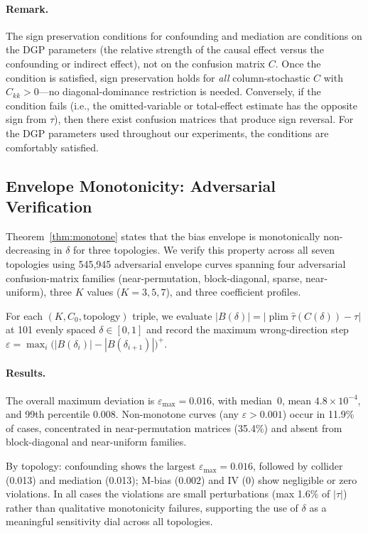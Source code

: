 \paragraph{Remark.}
The sign preservation conditions for confounding and mediation are conditions on the DGP parameters (the relative strength of the causal effect versus the confounding or indirect effect), not on the confusion matrix $C$.
Once the condition is satisfied, sign preservation holds for \emph{all} column-stochastic $C$ with $C_{kk}>0$---no diagonal-dominance restriction is needed.
Conversely, if the condition fails (i.e., the omitted-variable or total-effect estimate has the opposite sign from $\tau$), then there exist confusion matrices that produce sign reversal.
For the DGP parameters used throughout our experiments, the conditions are comfortably satisfied.

\subsection{Envelope Monotonicity: Adversarial Verification}
\label{app:monotonicity}

Theorem~\ref{thm:monotone} states that the bias envelope is monotonically non-decreasing in $\delta$ for three topologies.
We verify this property across all seven topologies using 545{,}945 adversarial envelope curves spanning four adversarial confusion-matrix families (near-permutation, block-diagonal, sparse, near-uniform), three $K$ values ($K{=}3,5,7$), and three coefficient profiles.

For each $(K, C_0, \text{topology})$ triple, we evaluate $|B(\delta)| = |\operatorname{plim}\hat\tau(C(\delta))-\tau|$ at 101 evenly spaced $\delta\in[0,1]$ and record the maximum wrong-direction step $\varepsilon = \max_i \bigl(|B(\delta_i)| - |B(\delta_{i+1})|\bigr)^+$.

\paragraph{Results.}
The overall maximum deviation is $\varepsilon_{\max}=0.016$, with median~0, mean $4.8{\times}10^{-4}$, and 99th percentile $0.008$.
Non-monotone curves (any $\varepsilon>0.001$) occur in 11.9\% of cases, concentrated in near-permutation matrices (35.4\%) and absent from block-diagonal and near-uniform families.

By topology: confounding shows the largest $\varepsilon_{\max}{=}0.016$, followed by collider (0.013) and mediation (0.013); M-bias ($0.002$) and IV ($0$) show negligible or zero violations.
In all cases the violations are small perturbations (max 1.6\% of $|\tau|$) rather than qualitative monotonicity failures, supporting the use of $\delta$ as a meaningful sensitivity dial across all topologies.

